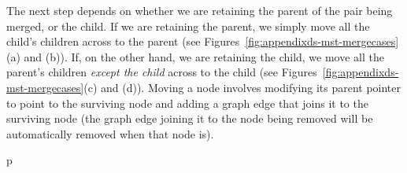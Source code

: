 The next step depends on whether we are retaining the parent of the pair being merged, or the child. If we are retaining the parent, we simply move all the child's children across to the parent (see Figures~\ref{fig:appendixds-mst-mergecases}(a) and (b)). If, on the other hand, we are retaining the child, we move all the parent's children \emph{except the child} across to the child (see Figures~\ref{fig:appendixds-mst-mergecases}(c) and (d)). Moving a node involves modifying its parent pointer to point to the surviving node and adding a graph edge that joins it to the surviving node (the graph edge joining it to the node being removed will be automatically removed when that node is).

\begin{stusubfig}{p}
	\hspace{4mm}%
	\\

\end{stusubfig}
